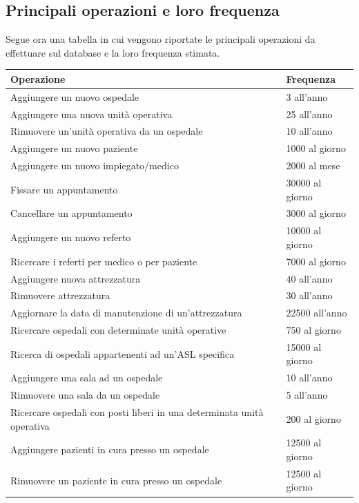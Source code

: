 \documentclass[a4paper,12pt]{report}
\begin{document}
\subsection{Principali operazioni e loro frequenza}
Segue ora una tabella in cui vengono riportate le principali operazioni da effettuare sul database e la loro frequenza stimata.
\begin{center}
  \begin{tabular}{ p{269pt} | l }
    Operazione & Frequenza \\
    \hline
    \hline
    Aggiungere un nuovo ospedale & 3 all'anno \\
    Aggiungere una nuova unità operativa & 25 all'anno \\
    Rimuovere un'unità operativa da un ospedale & 10 all'anno \\
    Aggiungere un nuovo paziente & 1000 al giorno \\
    Aggiungere un nuovo impiegato/medico & 2000 al mese \\
    Fissare un appuntamento & 30000 al giorno \\
    Cancellare un appuntamento & 3000 al giorno \\
    Aggiungere un nuovo referto & 10000 al giorno \\
    Ricercare i referti per medico o per paziente & 7000 al giorno \\
    Aggiungere nuova attrezzatura & 40 all'anno \\
    Rimuovere attrezzatura & 30 all'anno \\
    Aggiornare la data di manutenzione di un'attrezzatura & 22500 all'anno \\
    Ricercare ospedali con determinate unità operative & 750 al giorno \\
    Ricerca di ospedali appartenenti ad un'ASL specifica & 15000 al giorno \\
    Aggiungere una sala ad un ospedale & 10 all'anno \\
    Rimuovere una sala da un ospedale & 5 all'anno \\
    Ricercare ospedali con posti liberi in una determinata unità operativa & 200 al giorno \\
    Aggiungere pazienti in cura presso un ospedale & 12500 al giorno \\
    Rimuovere un paziente in cura presso un ospedale & 12500 al giorno \\
  \end{tabular}
\end{center}
\end{document}

